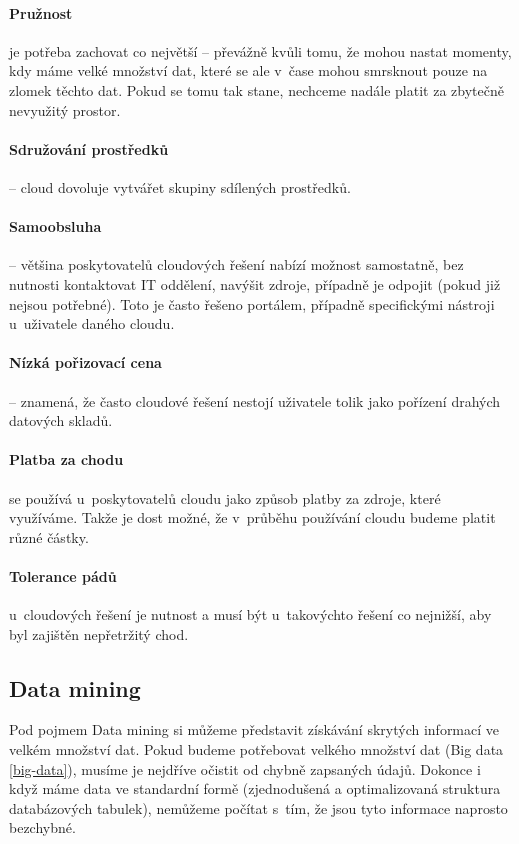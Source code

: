 \paragraph{Pružnost} je potřeba zachovat co největší -- převážně kvůli tomu, že mohou nastat momenty, kdy máme velké množství dat, které se ale v~čase mohou smrsknout pouze na zlomek těchto dat. Pokud se tomu tak stane, nechceme nadále platit za zbytečně nevyužitý prostor. \cite{big-data-dummies}

\paragraph{Sdružování prostředků} -- cloud dovoluje vytvářet skupiny sdílených prostředků. \cite{big-data-dummies}

\paragraph{Samoobsluha} -- většina poskytovatelů cloudových řešení nabízí možnost samostatně, bez nutnosti kontaktovat IT oddělení, navýšit zdroje, případně je odpojit (pokud již nejsou potřebné). Toto je často řešeno portálem, případně specifickými nástroji u~uživatele daného cloudu. \cite{big-data-dummies}

\paragraph{Nízká pořizovací cena} -- znamená, že často cloudové řešení nestojí uživatele tolik jako pořízení drahých datových skladů. \cite{big-data-dummies}

\paragraph{Platba za chodu} se používá u~poskytovatelů cloudu jako způsob platby za zdroje, které využíváme. Takže je dost možné, že v~průběhu používání cloudu budeme platit různé částky. \cite{big-data-dummies}

\paragraph{Tolerance pádů} u~cloudových řešení je nutnost a musí být u~takovýchto řešení co nejnižší, aby byl zajištěn nepřetržitý chod. \cite{big-data-dummies}

\subsection{Data mining} \label{data-mining}
\par Pod pojmem Data mining si můžeme představit získávání skrytých informací ve velkém množství dat. Pokud budeme potřebovat velkého množství dat (Big data \ref{big-data}), musíme je nejdříve očistit od chybně zapsaných údajů. Dokonce i když máme data ve standardní formě (zjednodušená a optimalizovaná struktura databázových tabulek), nemůžeme počítat s~tím, že jsou tyto informace naprosto bezchybné.\cite{data-mining-principles}

